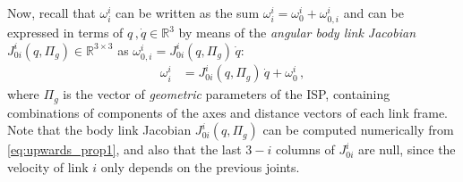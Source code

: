 
%

Now, recall that $\omega^{i}_{i}$ can be written as the sum $\omega^{i}_{i} = \omega^{i}_{0} + \omega^{i}_{0,i}$
%
and can be expressed in terms of $q\,,\dot{q}\in\mathbb{R}^{3}$ by means of the \textit{angular body link Jacobian} $J^i_{0i}(q,\Pi_g) \in \mathbb{R}^{3 \times 3}$ as $\omega^{i}_{0,i} = J^{i}_{0i}(q,\Pi_g) \, \dot{q}$:
%
%
\begin{align}
\omega^{i}_{i} &= J^{i}_{0i}(q,\Pi_g) \, \dot{q} + \omega^{i}_{0} \,,
\label{eq:gen_vel_transform1}
\end{align}
%
where $\Pi_g$ is the vector of {\it geometric} parameters of the ISP, containing combinations of components of the axes and distance vectors of each link frame.
%
Note that the body link Jacobian $J^i_{0i}(q,\Pi_g)$ can be computed numerically from \eqref{eq:upwards_prop1},
%
%
%
%
and also that the last $3-i$ columns of $J^i_{0i}$ are null, since the velocity of link $i$ only depends on the previous joints. 


